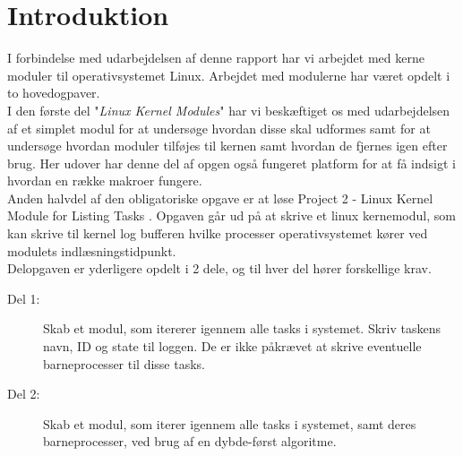 \documentclass[main.tex]{subfile}
\begin{document}
\section{Introduktion}
I forbindelse med udarbejdelsen af denne rapport har vi arbejdet med kerne moduler til operativsystemet Linux. Arbejdet med modulerne har været opdelt i to hovedogpaver.\\ 

I den første del "\emph{Linux Kernel Modules}" \cite[s.94]{SA:2013} har vi beskæftiget os med udarbejdelsen af et simplet modul for at undersøge hvordan disse skal udformes samt for at undersøge hvordan moduler tilføjes til kernen samt hvordan de fjernes igen efter brug. Her udover har denne del af opgen også fungeret platform for at få indsigt i hvordan en række makroer fungere.\\

Anden halvdel af den obligatoriske opgave er at løse Project 2 - Linux Kernel Module for Listing Tasks \cite[s.156-158]{SA:2013}. Opgaven går ud på at skrive et linux kernemodul, som kan skrive til kernel log bufferen hvilke processer operativsystemet kører ved modulets indlæsningstidpunkt.\\

Delopgaven er yderligere opdelt i 2 dele, og til hver del hører forskellige krav.

\begin{description}
\item[Del 1:] Skab et modul, som itererer igennem alle tasks i systemet. Skriv taskens navn, ID og state til loggen. De er ikke påkrævet at skrive eventuelle barneprocesser til disse tasks.
\item[Del 2:] Skab et modul, som iterer igennem alle tasks i systemet, samt deres barneprocesser, ved brug af en dybde-først algoritme.
\end{description}
\end{document}

